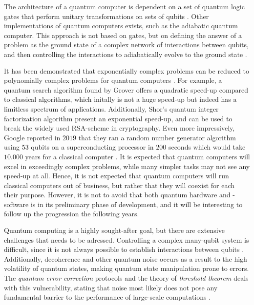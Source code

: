 The architecture of a quantum computer is dependent on a set of quantum logic gates that perform unitary transformations on sets of qubits \cite{DiVincenzo2000, Ladd2010}. Other implementations of quantum computers exists, such as the adiabatic quantum computer. This approach is not based on gates, but on defining the answer of a problem as the ground state of a complex network of interactions between qubits, and then controlling the interactions to adiabatically evolve to the ground state \cite{Mizel2007}.

It has been demonstrated that exponentially complex problems can be reduced to polynomially complex problems for quantum computers \cite{Pavicic2006}. For example, a quantum search algorithm found by Grover \cite{Grover1997} offers a quadratic speed-up compared to classical algorithms, which initally is not a huge speed-up but indeed has a limitless spectrum of applications. Additionally, Shor's quantum integer factorization algorithm \cite{Shor1994} present an exponential speed-up, and can be used to break the widely used RSA-scheme in cryptography. Even more impressively, Google reported in $2019$ that they ran a random number generator algorithm using 53 qubits on a superconducting processor in $200$ seconds which would take $10.000$ years for a classical computer \cite{Martinis2019}. It is expected that quantum computers will excel in exceedingly complex problems, while many simpler tasks may not see any speed-up at all. Hence, it is not expected that quantum computers will run classical computers out of business, but rather that they will coexist for each their purpose. However, it is not to avoid that both quantum  hardware and -software is in its preliminary phase of development, and it will be interesting to follow up the progression the following years.

Quantum computing is a highly sought-after goal, but there are extensive challenges that needs to be adressed. Controlling a complex many-qubit system is difficult, since it is not always possible to establish interactions between qubits \cite{DiVincenzo2000}. Additionally, decoherence and other quantum noise occurs as a result to the high volatility of quantum states, making quantum state manipulation prone to errors. The \textit{quantum error correction} protocols and the theory of \textit{threshold theorem} deals with this vulnerability, stating that noise most likely does not pose any fundamental barrier to the performance of large-scale computations \cite{Pavicic2006}.







 \newpage

